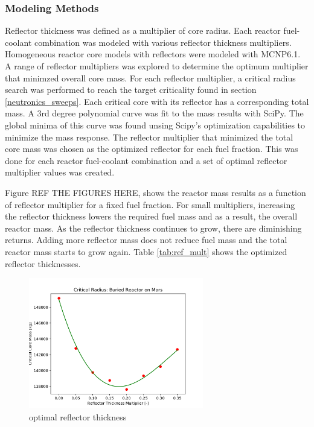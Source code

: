 \subsubsection{Modeling Methods}
Reflector thickness was defined as a multiplier of core radius. Each reactor
fuel-coolant combination was modeled with various reflector thickness
multipliers. Homogeneous reactor core models with reflectors were modeled with
MCNP6.1. A range of reflector multipliers was explored to determine the optimum
multiplier that minimzed overall core mass. For each reflector multiplier, a critical radius search was performed
to reach the target criticality found in section \ref{neutronics_sweeps}. Each
critical core with its reflector has a corresponding total mass. A 3rd degree
polynomial curve was fit to the mass results with SciPy\citep{scipy}. The global
minima of this curve was found unsing Scipy's optimization capabilities to
minimize the mass response. The
reflector multiplier that minimized the total core mass was chosen as the
optimized reflector for each fuel fraction.
This was done for each reactor fuel-coolant combination and a set of optimal
reflector multiplier values was created.

Figure REF THE FIGURES HERE, shows the reactor mass results as a function of
reflector multiplier for a fixed fuel fraction. For small multipliers, increasing the reflector thickness
lowers the required fuel mass and as a result, the overall reactor mass. As the
reflector thickness continues to grow, there are diminishing returns. Adding
more reflector mass does not reduce fuel mass and the total reactor mass starts
to grow again. Table \ref{tab:ref_mult} shows the optimized reflector
thicknesses.

\begin{figure}[h]
    \centering
    \includegraphics[width=3in]{../images/opt_refl_CO2_UO2.png}
\caption{\codiox \uox optimal reflector thickness}
\label{fig:uo2_co2_refl}
\end{figure}

